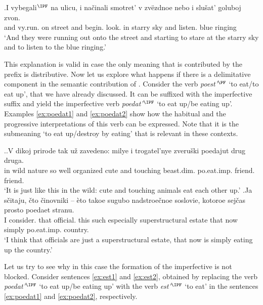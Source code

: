 \exg.\label{ex:vybegat}I vybegali$^{\IPF}$ na ulicu, i na\v{c}inali smotret' v zv\"{e}zdnoe nebo i slu\v{s}at' goluboj zvon.\\
and vy.run. on street and begin. look. in starry sky and listen. blue ringing\\
\trans `And they were running out onto the street and starting to stare at the starry sky and to listen to the blue ringing.'

This explanation is valid in case the only meaning that is contributed by the prefix is distributive. Now let us explore what happens if there is a delimitative component in the semantic contribution of . Consider the verb \textit{poest'}$^{\PF}$ `to eat/to eat up', that we have already discussed. It can be suffixed with the imperfective suffix and yield the imperfective verb \textit{poedat'}$^{\IPF}$ `to eat up/be eating up'. Examples \ref{ex:poedat1} and \ref{ex:poedat2} show how the habitual and the progressive interpretations of this verb can be expressed. Note that it is the submeaning `to eat up/destroy by eating' that is relevant in these contexts.

\ex.\ag.\label{ex:poedat1}V dikoj prirode tak u\v{z} zavedeno: milye i trogatel'nye zveru\v{s}ki poedajut drug druga.\\
in wild nature so well organized cute and touching beast.dim. po.eat.imp. friend. friend.\\
\trans `It is just like this in the wild: cute and touching animals eat each other up.'
\bg.\label{ex:poedat2}Ja s\v{c}itaju, \v{c}to \v{c}inovniki -- \`{e}to takoe sugubo nadstroe\v{c}noe soslovie, kotoroe sej\v{c}as prosto poedaet stranu.\\
I consider. that official. {} this such especially superstructural estate that now simply po.eat.imp. country.\\
\trans `I think that officials are just a superstructural estate, that now is simply eating up the country.'\\

Let us try to see why in this case the formation of the imperfective is not blocked. Consider sentences \ref{ex:est1} and \ref{ex:est2}, obtained by replacing the verb \textit{poedat'}$^{\IPF}$ `to eat up/be eating up' with the verb \textit{est'}$^{\IPF}$ `to eat' in the sentences \ref{ex:poedat1} and \ref{ex:poedat2}, respectively.
 

